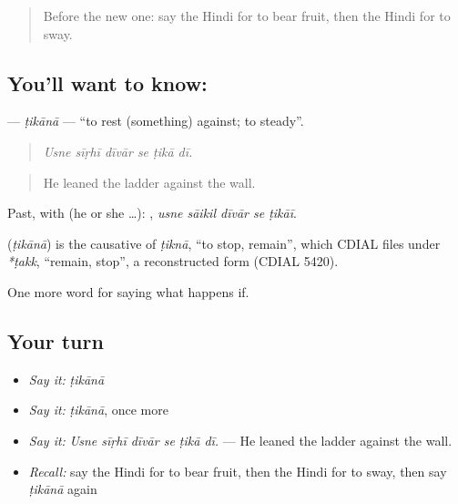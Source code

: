 \label{lesson:HI-C555-tikana}



\begin{quote}
Before the new one: say the Hindi for to bear fruit, then the Hindi for to sway.
\end{quote}

\subsection*{You'll want to know: }
\textbf{} — \emph{ṭikānā} — \textquotedblleft{}to rest (something) against; to steady\textquotedblright{}.

\begin{quote}
     
\end{quote}

\begin{quote}
\emph{Usne sīṛhī dīvār se ṭikā dī.}
\end{quote}

\begin{quote}
He leaned the ladder against the wall.
\end{quote}

Past, with  (he or she …):     , \emph{usne sāikil dīvār se ṭikāī}.

\begin{cousinweb}
\textbf{} (\emph{ṭikānā}) is the causative of \emph{ṭiknā}, \textquotedblleft{}to stop, remain\textquotedblright{}, which CDIAL files under \emph{*ṭakk}, \textquotedblleft{}remain, stop\textquotedblright{}, a reconstructed form (CDIAL 5420).
\end{cousinweb}

\begin{grammarlens}[title={What you've built}]
One more word for saying what happens if.
\end{grammarlens}

\subsection*{Your turn}
\begin{itemize}
\raggedright
  \item \emph{Say it:} \emph{ṭikānā}
  \item \emph{Say it:} \emph{ṭikānā}, once more
  \item \emph{Say it:} \emph{Usne sīṛhī dīvār se ṭikā dī.} — He leaned the ladder against the wall.
  \item \emph{Recall:} say the Hindi for to bear fruit, then the Hindi for to sway, then say \emph{ṭikānā} again
\end{itemize}

